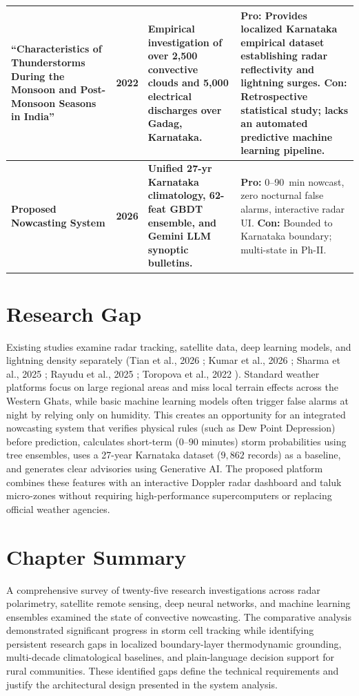 \documentclass[12pt,a4paper]{report}
\begin{document}
\begin{xltabular}{\textwidth}{|L{3.8cm}|C{1.3cm}|L{4.3cm}|Y|}
``Characteristics of Thunderstorms During the Monsoon and Post-Monsoon Seasons in India'' \cite{toropova2022characteristics} & 2022 & Empirical investigation of over 2,500 convective clouds and 5,000 electrical discharges over Gadag, Karnataka. & \textbf{Pro:} Provides localized Karnataka empirical dataset establishing radar reflectivity and lightning surges. \newline \textbf{Con:} Retrospective statistical study; lacks an automated predictive machine learning pipeline. \\ \hline
{}
\textbf{Proposed Nowcasting System} & \textbf{2026} & \textbf{Unified 27-yr Karnataka climatology, 62-feat GBDT ensemble, and Gemini LLM synoptic bulletins.} & \textbf{Pro:} 0--90~min nowcast, zero nocturnal false alarms, interactive radar UI. \newline \textbf{Con:} Bounded to Karnataka boundary; multi-state in Ph-II. \\ \hline
\end{xltabular}
\endgroup

\section{Research Gap}
Existing studies examine radar tracking, satellite data, deep learning models, and lightning density separately (Tian et al., 2026 \cite{tian2026dual}; Kumar et al., 2026 \cite{kumar2026enhancing}; Sharma et al., 2025 \cite{sharma2025insat}; Rayudu et al., 2025 \cite{rayudu2025prediction}; Toropova et al., 2022 \cite{toropova2022characteristics}). Standard weather platforms focus on large regional areas and miss local terrain effects across the Western Ghats, while basic machine learning models often trigger false alarms at night by relying only on humidity. This creates an opportunity for an integrated nowcasting system that verifies physical rules (such as Dew Point Depression) before prediction, calculates short-term ($0$--$90$ minutes) storm probabilities using tree ensembles, uses a 27-year Karnataka dataset ($9,862$ records) as a baseline, and generates clear advisories using Generative AI. The proposed platform combines these features with an interactive Doppler radar dashboard and taluk micro-zones without requiring high-performance supercomputers or replacing official weather agencies.

\section{Chapter Summary}
A comprehensive survey of twenty-five research investigations across radar polarimetry, satellite remote sensing, deep neural networks, and machine learning ensembles examined the state of convective nowcasting. The comparative analysis demonstrated significant progress in storm cell tracking while identifying persistent research gaps in localized boundary-layer thermodynamic grounding, multi-decade climatological baselines, and plain-language decision support for rural communities. These identified gaps define the technical requirements and justify the architectural design presented in the system analysis.
\end{document}
